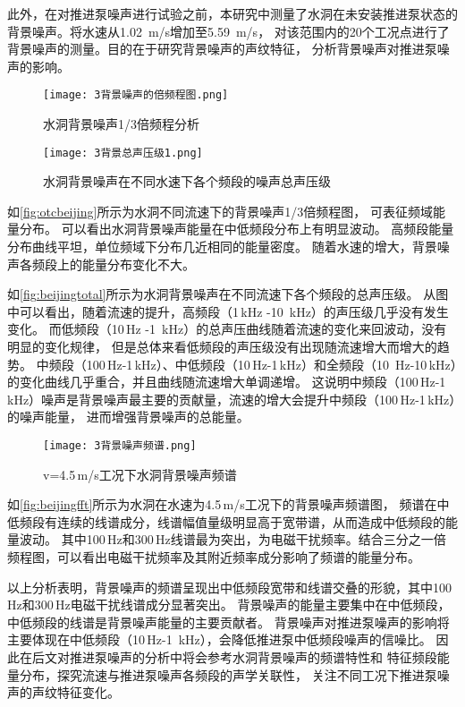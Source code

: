 此外，在对推进泵噪声进行试验之前，本研究中测量了水洞在未安装推进泵状态的背景噪声。将水速从1.02 \,m/s增加至5.59 \,m/s，
对该范围内的20个工况点进行了背景噪声的测量。目的在于研究背景噪声的声纹特征，
分析背景噪声对推进泵噪声的影响。
\begin{figure}[htbp]
    \centering
    \texttt{[image: 3背景噪声的倍频程图.png]}
    \caption{\label{fig:otcbeijing}水洞背景噪声1/3倍频程分析}
\end{figure}
\begin{figure}[htbp]
    \centering
    \texttt{[image: 3背景总声压级1.png]}
    \caption{\label{fig:beijingtotal}水洞背景噪声在不同水速下各个频段的噪声总声压级}
\end{figure}

如\autoref{fig:otcbeijing}所示为水洞不同流速下的背景噪声1/3倍频程图，
可表征频域能量分布。
可以看出水洞背景噪声能量在中低频段分布上有明显波动。
高频段能量分布曲线平坦，单位频域下分布几近相同的能量密度。
随着水速的增大，背景噪声各频段上的能量分布变化不大。

如\autoref{fig:beijingtotal}所示为水洞背景噪声在不同流速下各个频段的总声压级。
从图中可以看出，随着流速的提升，高频段（1\,kHz -10 \,kHz）的声压级几乎没有发生变化。
而低频段（10\,Hz -1 \,kHz）的总声压曲线随着流速的变化来回波动，没有明显的变化规律，
但是总体来看低频段的声压级没有出现随流速增大而增大的趋势。
中频段（100\,Hz-1\,kHz）、中低频段（10\,Hz-1\,kHz）和全频段（10 \,Hz-10\,kHz）的变化曲线几乎重合，并且曲线随流速增大单调递增。
这说明中频段（100\,Hz-1\,kHz）噪声是背景噪声最主要的贡献量，流速的增大会提升中频段（100\,Hz-1\,kHz）的噪声能量，
进而增强背景噪声的总能量。
\begin{figure}[htbp]
    \centering
    \texttt{[image: 3背景噪声频谱.png]}
    \caption{\label{fig:beijingfft}v=4.5\,m/s工况下水洞背景噪声频谱}
\end{figure}

如\autoref{fig:beijingfft}所示为水洞在水速为4.5\,m/s工况下的背景噪声频谱图，
频谱在中低频段有连续的线谱成分，线谱幅值量级明显高于宽带谱，从而造成中低频段的能量波动。
其中100\,Hz和300\,Hz线谱最为突出，为电磁干扰频率。结合三分之一倍频程图，可以看出电磁干扰频率及其附近频率成分影响了频谱的能量分布。

以上分析表明，背景噪声的频谱呈现出中低频段宽带和线谱交叠的形貌，其中100\,Hz和300\,Hz电磁干扰线谱成分显著突出。
背景噪声的能量主要集中在中低频段，中低频段的线谱是背景噪声能量的主要贡献者。
背景噪声对推进泵噪声的影响将主要体现在中低频段（10\,Hz-1 \,kHz），会降低推进泵中低频段噪声的信噪比。
因此在后文对推进泵噪声的分析中将会参考水洞背景噪声的频谱特性和
特征频段能量分布，探究流速与推进泵噪声各频段的声学关联性，
关注不同工况下推进泵噪声的声纹特征变化。
